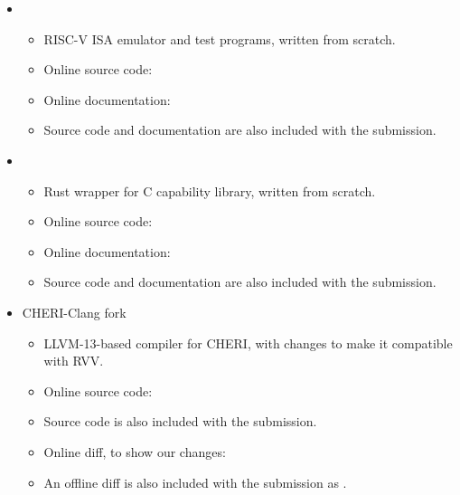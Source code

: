 \begin{itemize}
    \item[] 
    \begin{itemize}
        \item[] RISC-V ISA emulator and test programs, written from scratch.
        \item[] Online source code: 
        \item[] Online documentation: 
        \item[] Source code and documentation are also included with the submission.
    \end{itemize}
    \item[] 
    \begin{itemize}
        \item[] Rust wrapper for C capability library, written from scratch.
        \item[] Online source code: 
        \item[] Online documentation: 
        \item[] Source code and documentation are also included with the submission.
    \end{itemize}
    \item[] CHERI-Clang fork
    \begin{itemize}
        \item[] LLVM-13-based compiler for CHERI, with changes to make it compatible with RVV.
        \item[] Online source code: 
        \item[] Source code is also included with the submission.
        \item[] Online diff, to show our changes: 
        \item[] An offline diff is also included with the submission as .
    \end{itemize}
\end{itemize}